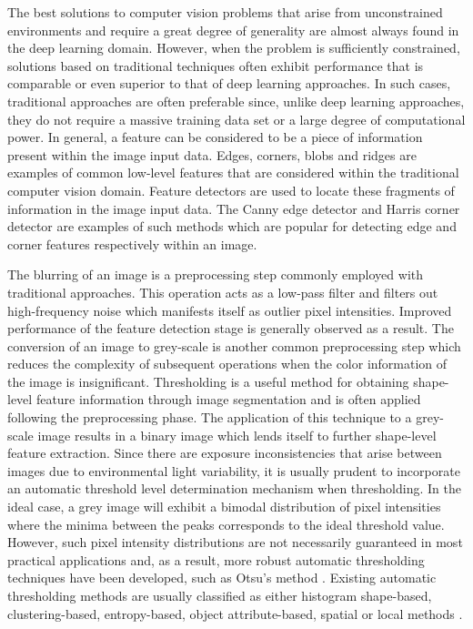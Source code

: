 The best solutions to computer vision problems that arise from unconstrained environments and require a great degree of generality are almost always found in the deep learning domain. However, when the problem is sufficiently constrained, solutions based on traditional techniques often exhibit performance that is comparable or even superior to that of deep learning approaches. In such cases, traditional approaches are often preferable since, unlike deep learning approaches, they do not require a massive training data set or a large degree of computational power. In general, a feature can be considered to be a piece of information present within the image input data. Edges, corners, blobs and ridges are examples of common low-level features that are considered within the traditional computer vision domain. Feature detectors are used to locate these fragments of information in the image input data. The Canny edge detector \cite{Canny:Computational_Edge_Detection} and Harris corner detector \cite{ Harris:Corner_and_Edge_Detector} are examples of such methods which are popular for detecting edge and corner features respectively within an image.

The blurring of an image is a preprocessing step commonly employed with traditional approaches. This operation acts as a low-pass filter and filters out high-frequency noise which manifests itself as outlier pixel intensities. Improved performance of the feature detection stage is generally observed as a result. The conversion of an image to grey-scale is another common preprocessing step which reduces the complexity of subsequent operations when the color information of the image is insignificant. Thresholding is a useful method for obtaining shape-level feature information through image segmentation and is often applied following the preprocessing phase. The application of this technique to a grey-scale image results in a binary image which lends itself to further shape-level feature extraction. Since there are exposure inconsistencies that arise between images due to environmental light variability, it is usually prudent to incorporate an automatic threshold level determination mechanism when thresholding. In the ideal case, a grey image will exhibit a bimodal distribution of pixel intensities where the minima between the peaks corresponds to the ideal threshold value. However, such pixel intensity distributions are not necessarily guaranteed in most practical applications and, as a result, more robust automatic thresholding techniques have been developed, such as Otsu's method \cite{Otsu:Threshold_Selection_Method}. Existing automatic thresholding methods are usually classified as either histogram shape-based, clustering-based, entropy-based, object attribute-based, spatial or local methods \cite{Guruprasad:Overview_of_Thresholding_Methods}.

